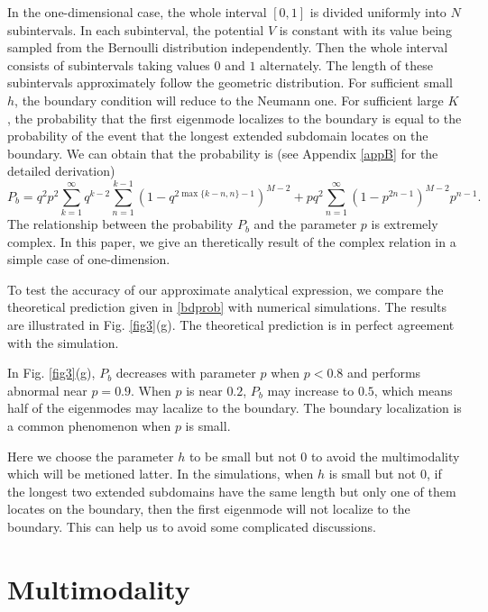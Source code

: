 \documentclass[a4paper,11pt]{article}
\begin{document}
In the one-dimensional case, the whole interval $[0, 1]$ is divided uniformly into $N$ subintervals. In each subinterval, the potential $V$ is constant with its value being sampled from the Bernoulli distribution independently. Then the whole interval consists of subintervals taking values $0$ and $1$ alternately. The length of these subintervals approximately follow the geometric distribution. For sufficient small $h$, the boundary condition will reduce to the Neumann one. For sufficient large $K$, the probability that the first eigenmode localizes to the boundary is equal to the probability of the event that the longest extended subdomain locates on the boundary. We can obtain that the probability is (see Appendix \ref{appB} for the detailed derivation)
\begin{equation}\label{bdprob}
P_b = q^2 p^2 \sum_{k=1}^{\infty} q^{k-2} \sum_{n=1}^{k-1} (1 - q^{2 \max\{k-n,n\}-1})^{M-2} + p q^2 \sum_{n=1}^{\infty} (1 - p^{2 n-1})^{M-2} p^{n-1}.
\end{equation}
The relationship between the probability $P_b$ and the parameter $p$ is extremely complex. In this paper, we give an theretically result of the complex relation in a simple case of one-dimension.

To test the accuracy of our approximate analytical expression, we compare the theoretical prediction given in \eqref{bdprob} with numerical simulations. The results are illustrated in Fig. \ref{fig3}(g). The theoretical prediction is in perfect agreement with the simulation.

In Fig. \ref{fig3}(g), $P_b$ decreases with parameter $p$ when $p<0.8$ and performs abnormal near $p=0.9$. When $p$ is near $0.2$, $P_b$ may increase to $0.5$, which means half of the eigenmodes may lacalize to the boundary. The boundary localization is a common phenomenon when $p$ is small.

Here we choose the parameter $h$ to be small but not $0$ to avoid the multimodality which will be metioned latter. In the simulations, when $h$ is small but not $0$, if the longest two extended subdomains have the same length but only one of them locates on the boundary, then the first eigenmode will not localize to the boundary. This can help us to avoid some complicated discussions.


\section{Multimodality}
\end{document}

